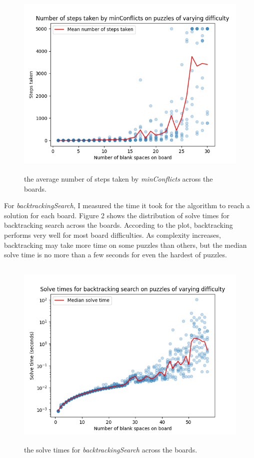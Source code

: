\documentclass[12pt]{article}
\begin{document}
	\begin{figure}[h]
	\centering
	\includegraphics[height=3.65in]{figure1.png}
	\caption{the average number of steps taken by \textit{minConflicts} across the boards.}
	\end{figure}
	
	For \textit{backtrackingSearch}, I measured the time it took for the algorithm to reach a solution for each board. Figure 2 shows the distribution of solve times for backtracking search across the boards. According to the plot, backtracking performs very well for most board difficulties. As complexity increases, backtracking may take more time on some puzzles than others, but the median solve time is no more than a few seconds for even the hardest of puzzles.
	
	\begin{figure}[h]
	\centering
	\includegraphics[height=3.65in]{figure2.png}
	\caption{the solve times for \textit{backtrackingSearch} across the boards.}
	\end{figure}
	
\end{document}
